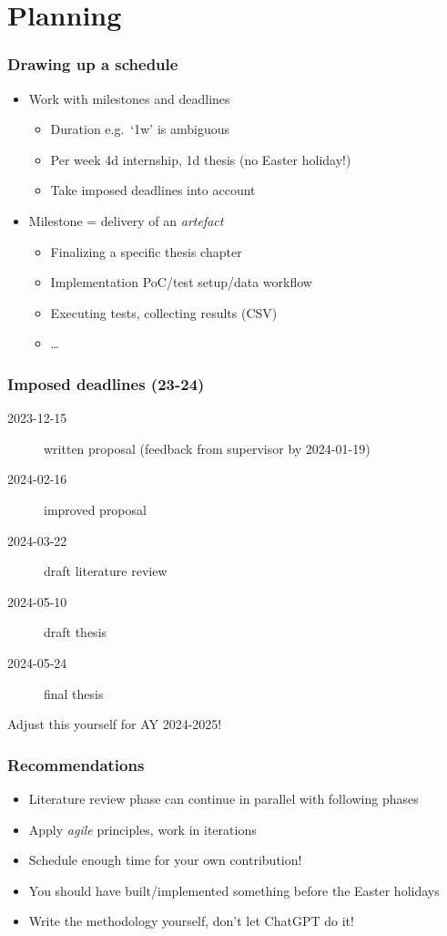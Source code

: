 \documentclass[aspectratio=169]{beamer}
\begin{document}
\section{Planning}

\begin{frame}
  \frametitle{Drawing up a schedule}

  \begin{itemize}
    \item Work with milestones and deadlines
    \begin{itemize}
      \item Duration e.g.\ `1w' is ambiguous
      \item Per week 4d internship, 1d thesis (no Easter holiday!)
      \item Take imposed deadlines into account
    \end{itemize}
    \item Milestone = delivery of an \textit{artefact}
    \begin{itemize}
      \item Finalizing a specific thesis chapter
      \item Implementation PoC/test setup/data workflow
      \item Executing tests, collecting results (CSV)
      \item \ldots
    \end{itemize}
  \end{itemize}

\end{frame}

\begin{frame}
  \frametitle{Imposed deadlines (23-24)}

  \begin{description}
    \item[2023-12-15] written proposal (feedback from supervisor by 2024-01-19)
    \item[2024-02-16] improved proposal
    \item[2024-03-22] draft literature review
    \item[2024-05-10] draft thesis
    \item[2024-05-24] final thesis
  \end{description}

  \medskip

  Adjust this yourself for AY 2024-2025!
\end{frame}

\begin{frame}
  \frametitle{Recommendations}

  \begin{itemize}
    \item Literature review phase can continue in parallel with following phases
    \item Apply \textit{agile} principles, work in iterations
    \item Schedule enough time for your own contribution!
    \item You should have built/implemented something before the Easter holidays
    \item Write the methodology yourself, don't let ChatGPT do it!
  \end{itemize}
\end{frame}
\end{document}

